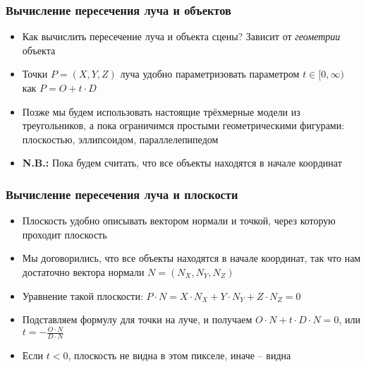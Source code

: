 \documentclass[10pt]{beamer}
\begin{document}
\begin{frame}
\frametitle{Вычисление пересечения луча и объектов}
\begin{itemize}
\item Как вычислить пересечение луча и объекта сцены? \pause Зависит от \textit{геометрии} объекта
\pause
\item Точки \begin{math}P = (X,Y,Z)\end{math} луча удобно параметризовать параметром \begin{math}t \in [0, \infty)\end{math} как \begin{math}P = O + t \cdot D\end{math}
\pause
\item Позже мы будем использовать настоящие трёхмерные модели из треугольников, а пока ограничимся простыми геометрическими фигурами: плоскостью, эллипсоидом, параллелепипедом
\pause
\item \alert{\textbf{N.B.:}} Пока будем считать, что все объекты находятся в начале координат
\end{itemize}
\end{frame}

\begin{frame}
\frametitle{Вычисление пересечения луча и плоскости}
\begin{itemize}
\item Плоскость удобно описывать вектором нормали и точкой, через которую проходит плоскость
\pause
\item Мы договорились, что все объекты находятся в начале координат, так что нам достаточно вектора нормали \begin{math}N = (N_X, N_Y, N_Z)\end{math}
\pause
\item Уравнение такой плоскости: \begin{math}P\cdot N = X\cdot N_X+Y\cdot N_Y+Z\cdot N_Z=0\end{math}
\pause
\item Подставляем формулу для точки на луче, и получаем \begin{math}O \cdot N + t \cdot D \cdot N = 0\end{math}, или \begin{math}t = -\frac{O \cdot N}{D \cdot N}\end{math}
\pause
\item Если \begin{math}t<0\end{math}, плоскость не видна в этом пикселе, иначе -- видна
\end{itemize}
\end{frame}
\end{document}
